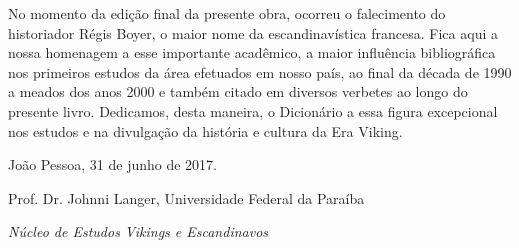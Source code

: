 No momento da edição final da presente obra, ocorreu o falecimento do
historiador Régis Boyer, o maior nome da escandinavística francesa. Fica
aqui a nossa homenagem a esse importante acadêmico, a maior influência
bibliográfica nos primeiros estudos da área efetuados em nosso país, ao
final da década de 1990 a meados dos anos 2000 e também citado em
diversos verbetes ao longo do presente livro. Dedicamos, desta maneira,
o Dicionário a essa figura excepcional nos estudos e na divulgação da
história e cultura da Era Viking.\medskip

\hfill João Pessoa, 31 de junho de 2017.

\hfill Prof. Dr. Johnni Langer, Universidade Federal da Paraíba

\hfill \emph{Núcleo de Estudos Vikings e Escandinavos}
